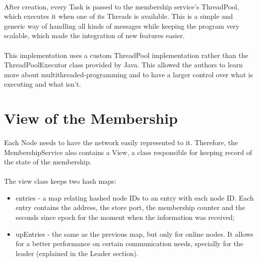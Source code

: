 \documentclass{report}
\begin{document}
	        	\paragraph{}After creation, every Task is passed to the membership service's ThreadPool, which executes it when one of its Threads is available. This is a simple and generic way of handling all kinds of messages while keeping the program very scalable, which made the integration of new features easier.
	        	
	        	\paragraph{}This implementation uses a custom ThreadPool implementation rather than the ThreadPoolExecutor class provided by Java. This allowed the authors to learn more about multithreaded-programming and to have a larger control over what is executing and what isn't.
	        	
        	\section{View of the Membership}
        	
        		\paragraph{}Each Node needs to have the network easily represented to it. Therefore, the MembershipService also contains a View, a class responsible for keeping record of the state of the membership.
        		
        		\paragraph{}The view class keeps two hash maps:
        		
        		\begin{itemize}
        			\item entries - a map relating hashed node IDs to an entry with each node ID. Each entry contains the address, the store port, the membership counter and the seconds since epoch for the moment when the information was received;
        			\item upEntries - the same as the previous map, but only for online nodes. It allows for a better performance on certain communication needs, specially for the leader (explained in the Leader section).
        		\end{itemize}
        	
\end{document}
